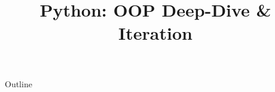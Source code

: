\documentclass[xcolor=dvipsnames,compress,t,pdf]{beamer}
\title[\insertframenumber /\inserttotalframenumber]{Python: OOP Deep-Dive \& Iteration}
\begin{document}
	\begin{frame}
	\titlepage
	\end{frame}

	\begin{frame}{Outline}
	    \tableofcontents
	\end{frame}

	
	
	
\end{document}
